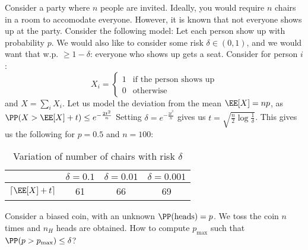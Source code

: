 \begin{eg}[Design]
Consider a party where $n$ people are invited. Ideally, you would require $n$ chairs in a room to accomodate everyone. However, it is known that not everyone shows up at the party. Consider the following model: Let each person show up with probability $p$. We would also like to consider some risk $\delta \in (0,1)$, and we would want that w.p. $\geq 1-\delta$: everyone who shows up gets a seat. Consider for person $i$:
\[
X_i = \begin{cases}
    1 & \text{if the person shows up} \\
    0 & \text{otherwise}
\end{cases}
\]
and $X = \sum_i X_i$. Let us model the deviation from the mean $\EE[X] = np$, as $\PP(X > \EE[X] + t) \leq e^{-\frac{2t^2}{n}}$
Setting $\delta = e^{-\frac{2t^2}{n}}$ gives us $t = \sqrt{\frac{n}{2} \log\frac{1}{\delta}}$. This gives us the following for $p=0.5$ and $n=100$:
\begin{table}[H]
    \centering
    \begin{tabular}{c|c|c|c}
         & $\delta=0.1$ & $\delta=0.01$ & $\delta=0.001$\\ \hline
        $\lceil\EE[X]+t\rceil$ & 61 & 66 & 69\\
    \end{tabular}
    \caption{Variation of number of chairs with risk $\delta$}
    \label{tab:eg1}
\end{table}
\end{eg}
\begin{eg}[Inference]
Consider a biased coin, with an unknown $\PP(\text{heads}) = p$. We toss the coin $n$ times and $n_H$ heads are obtained. How to compute $p_\text{max}$ such that $\PP(p > p_\text{max}) \leq \delta$?
\end{eg}

